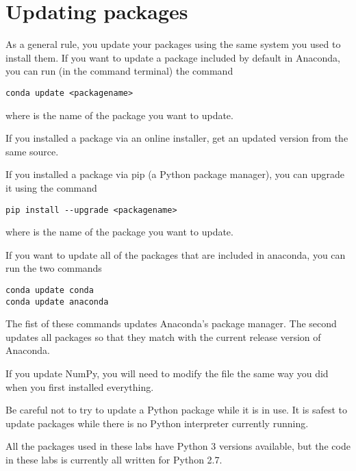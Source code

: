 \section*{Updating packages}
As a general rule, you update your packages using the same system you used to install them.
If you want to update a package included by default in Anaconda, you can run (in the command terminal) the command
\begin{lstlisting}[style=ShellInput]
conda update <packagename>
\end{lstlisting}
where  is the name of the package you want to update.

If you installed a package via an online installer, get an updated version from the same source.

If you installed a package via pip (a Python package manager), you can upgrade it using the command
\begin{lstlisting}[style=ShellInput]
pip install --upgrade <packagename>
\end{lstlisting}
where  is the name of the package you want to update.

If you want to update all of the packages that are included in anaconda, you can run the two commands
\begin{lstlisting}[style=ShellInput]
conda update conda
conda update anaconda
\end{lstlisting}
The fist of these commands updates Anaconda's package manager.
The second updates all packages so that they match with the current release version of Anaconda.

\begin{info}
If you update NumPy, you will need to modify the file  the same way you did when you first installed everything.
\end{info}

\begin{warn}
Be careful not to try to update a Python package while it is in use.
It is safest to update packages while there is no Python interpreter currently running.
\end{warn}

\begin{info}
All the packages used in these labs have Python 3 versions available, but the code in these labs is currently all written for Python 2.7.
\end{info}